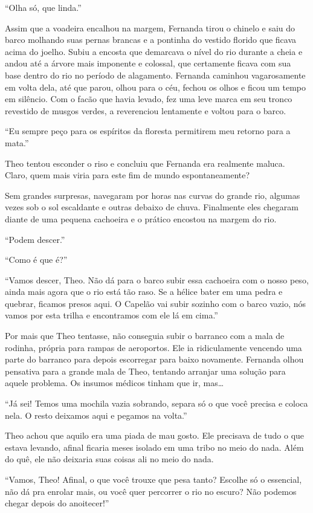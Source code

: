 ``Olha só, que linda.''

Assim que a voadeira encalhou na margem, Fernanda tirou o chinelo e saiu
do barco molhando suas pernas brancas e a pontinha do vestido florido
que ficava acima do joelho. Subiu a encosta que demarcava o nível do rio
durante a cheia e andou até a árvore mais imponente e colossal, que
certamente ficava com sua base dentro do rio no período de alagamento.
Fernanda caminhou vagarosamente em volta dela, até que parou, olhou para
o céu, fechou os olhos e ficou um tempo em silêncio. Com o facão que
havia levado, fez uma leve marca em seu tronco revestido de musgos
verdes, a reverenciou lentamente e voltou para o barco.

``Eu sempre peço para os espíritos da floresta permitirem meu retorno
para a mata.''

Theo tentou esconder o riso e concluiu que Fernanda era realmente
maluca. Claro, quem mais viria para este fim de mundo espontaneamente?

Sem grandes surpresas, navegaram por horas nas curvas do grande rio,
algumas vezes sob o sol escaldante e outras debaixo de chuva. Finalmente
eles chegaram diante de uma pequena cachoeira e o prático encostou na
margem do rio.

``Podem descer.''

``Como é que é?''

``Vamos descer, Theo. Não dá para o barco subir essa cachoeira com o
nosso peso, ainda mais agora que o rio está tão raso. Se a hélice bater
em uma pedra e quebrar, ficamos presos aqui. O Capelão vai subir sozinho
com o barco vazio, nós vamos por esta trilha e encontramos com ele lá em
cima.''

Por mais que Theo tentasse, não conseguia subir o barranco com a mala de
rodinha, própria para rampas de aeroportos. Ele ia ridiculamente
vencendo uma parte do barranco para depois escorregar para baixo
novamente. Fernanda olhou pensativa para a grande mala de Theo, tentando
arranjar uma solução para aquele problema. Os insumos médicos tinham que
ir, mas\ldots{}

``Já sei! Temos uma mochila vazia sobrando, separa só o que você precisa
e coloca nela. O resto deixamos aqui e pegamos na volta.''

Theo achou que aquilo era uma piada de mau gosto. Ele precisava de tudo
o que estava levando, afinal ficaria meses isolado em uma tribo no meio
do nada. Além do quê, ele não deixaria suas coisas ali no meio do nada.

``Vamos, Theo! Afinal, o que você trouxe que pesa tanto? Escolhe só o
essencial, não dá pra enrolar mais, ou você quer percorrer o rio no
escuro? Não podemos chegar depois do anoitecer!''

